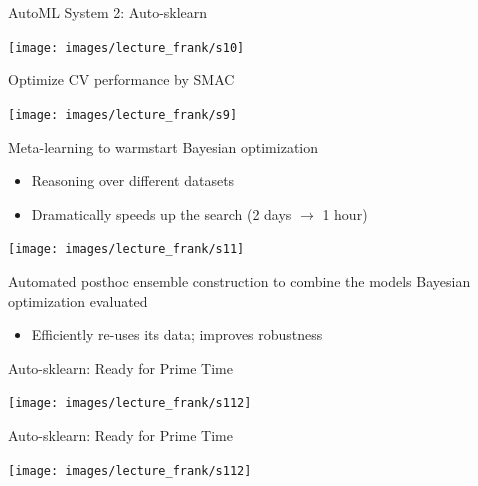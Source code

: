 \begin{frame}[c]{AutoML System 2: Auto-sklearn}

{\centering
	\texttt{[image: images/lecture\_frank/s10]}
}
\begin{itemize}
	\begin{minipage}{0.55\textwidth}
		\item Optimize CV performance by SMAC
	\end{minipage}
	\begin{minipage}{0.26\textwidth}
		{\centering
			\texttt{[image: images/lecture\_frank/s9]}
		}
	\end{minipage}
	\begin{minipage}{0.75\textwidth}
	\item \alert{Meta-learning} to warmstart Bayesian optimization
	\begin{itemize}
		\item Reasoning over different datasets
		\item Dramatically speeds up the search (2 days $\rightarrow$ 1 hour)
	\end{itemize}
	\end{minipage}
	\begin{minipage}{0.15\textwidth}
	{\centering
		\texttt{[image: images/lecture\_frank/s11]}
	}
	\end{minipage}
	\item Automated \alert{posthoc ensemble construction}
	to combine the models Bayesian optimization evaluated
		\begin{itemize}
			\item Efficiently re-uses its data; improves robustness
		\end{itemize}
\end{itemize}
\end{frame}
\begin{frame}[c]{Auto-sklearn: Ready for Prime Time}

{\centering
	\texttt{[image: images/lecture\_frank/s112]}
}
\end{frame}
\begin{frame}[c]{Auto-sklearn: Ready for Prime Time}

{\centering
	\texttt{[image: images/lecture\_frank/s112]}
}
\end{frame}
